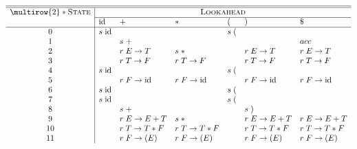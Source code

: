 \centering
\small
$\begin{array}{c|llllll}
\hline\hline
\multirow{2}*{\textsc{State}} & \multicolumn{6}{c}{\textsc{Lookahead}} \\\cline{2-7}
                             & \text{id} & + & * & ( & ) & \$\\
\hline
0  & s \; \text{id} &    &    & s \;( &    &  \\
1  &    & s\;+ &    &    &    & acc           \\
2  &    & r \;E\to T & s \; * &    & r \;E\to T & r \;E\to T  \\
3  &    & r \; T \to F & r \; T \to F &    & r \; T \to F & r \; T \to F \\
4  & s \; \text{id} &    &    & s \;( &    &  \\
5  &    & r \; F \to \text{id} & r \; F \to \text{id} &    & r \; F \to \text{id} & r \; F \to \text{id} \\
6  & s \; \text{id} &    &    & s \;( &    &  \\
7  & s \; \text{id} &    &    & s \;( &    &  \\
8  &    & s\;+ &    &    & s \; )&  \\
9  &    & r \; E \to E+T & s\;* &    & r \; E \to E+T & r \; E \to E+T \\
10 &    & r \; T \to T * F & r \; T \to T * F &    & r \; T \to T * F & r \; T \to T * F  \\
11 &    & r \; F \to (E) & r \; F \to (E) &    & r \; F \to (E) & r \; F \to (E)
\end{array}$